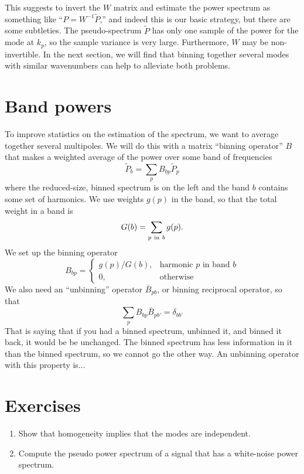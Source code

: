 This suggests to invert the $W$ matrix and estimate the power spectrum as something like ``$P = W^{-1} \tilde P$,'' and indeed this is our basic strategy, but there are some subtleties.  The pseudo-spectrum $\tilde P$ has only one sample of the power for the mode at $k_p$, so the sample variance is very large.  Furthermore, $W$ may be non-invertible.  In the next section, we will find that binning together several modes with similar wavenumbers can help to alleviate both problems.

\section{Band powers}
To improve statistics on the estimation of the spectrum, we want to average together several multipoles.  We will do this with a matrix ``binning operator'' $B$ that makes a weighted average of the power over some band of frequencies
\begin{equation}
  \tilde P_b  = \sum_p B_{bp} \tilde P_p
\end{equation}
where the reduced-size, binned spectrum is on the left and the band $b$ contains some set of harmonics.  We use weights $g(p)$ in the band, so that the total weight in a band is
\begin{equation}
  G(b) = \sum_{p\ {\rm in}\ b} g(p).
\end{equation}
We set up the binning operator
\begin{equation}
  B_{bp} = \left\{
  \begin{array}{ll}
   g(p)/G(b), &  \mbox{harmonic $p$ in band $b$} \\
   0, & \mbox{otherwise}
  \end{array} 
  \right.
\end{equation}
We also need an ``unbinning'' operator $\bar B_{pb}$, or binning reciprocal operator, so that
\begin{equation}
  \sum_p B_{bp}\bar B_{pb'} = \delta_{bb'}
\end{equation}
That is saying that if you had a binned spectrum, unbinned it, and binned it back, it would be be unchanged.  The binned spectrum has less information in it than the binned spectrum, so we cannot go the other way.
An unbinning operator with this property is... 


\nocite{numerical_recipes,master,namaster}


\section*{Exercises}

\begin{enumerate}

\item Show that homogeneity implies that the modes are independent.

\item Compute the pseudo power spectrum of a signal that has a white-noise power spectrum.
  
\end{enumerate}

